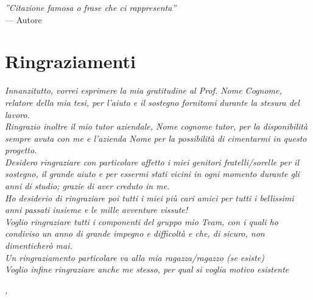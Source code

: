 
\cleardoublepage
{}
{}

\begin{flushright}{
	\slshape    
	''Citazione famosa o frase che ci rappresenta''} \\ 
	\medskip
    --- Autore
\end{flushright}


\bigskip

\begingroup
\let\clearpage\relax
\let\cleardoublepage\relax
\let\cleardoublepage\relax

\chapter*{Ringraziamenti}

\noindent \textit{Innanzitutto, vorrei esprimere la mia gratitudine al Prof. Nome Cognome, relatore della mia tesi, per l'aiuto e il sostegno fornitomi durante la stesura del lavoro.}\\

\noindent \textit{Ringrazio inoltre il mio tutor aziendale, Nome cognome tutor, per la disponibilità sempre avuta con me e l'azienda Nome per la possibilità di cimentarmi in questo progetto.}\\

\noindent \textit{Desidero ringraziare con particolare affetto i miei genitori fratelli/sorelle per il sostegno, il grande aiuto e per essermi stati vicini in ogni momento durante gli anni di studio; grazie di aver creduto in me.}\\

\noindent \textit{Ho desiderio di ringraziare poi tutti i miei più cari amici per tutti i bellissimi anni passati insieme e le mille avventure vissute!}\\

\noindent \textit{Voglio ringraziare tutti i componenti del gruppo mio Team, con i quali ho condiviso un anno di grande impegno e difficoltà e che, di sicuro, non dimenticherò mai.}\\

\noindent \textit{Un ringraziamento particolare va alla mia ragazza/ragazzo (se esiste) }\\

\noindent \textit{Voglio infine ringraziare anche me stesso, per qual si voglia motivo esistente}\\
\bigskip

\noindent\textit{\myLocation, \myTime}
\hfill \myName

\endgroup

